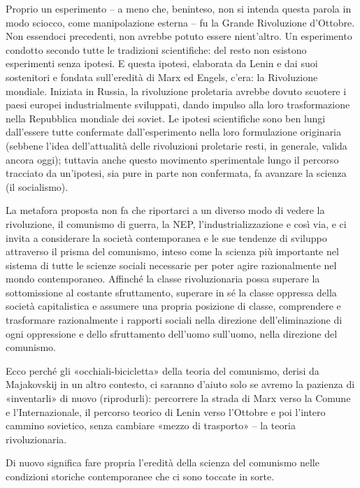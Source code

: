 \documentclass[../main]{subfiles}
\begin{document}
Proprio un esperimento – a meno che, beninteso, non si intenda questa parola in modo sciocco, come manipolazione esterna – fu la Grande Rivoluzione d'Ottobre. Non essendoci precedenti, non avrebbe potuto essere nient'altro. Un esperimento condotto secondo tutte le tradizioni scientifiche: del resto non esistono esperimenti senza ipotesi. E questa ipotesi, elaborata da Lenin e dai suoi sostenitori e fondata sull'eredità di Marx ed Engels, c'era: la Rivoluzione mondiale. Iniziata in Russia, la rivoluzione proletaria avrebbe dovuto scuotere i paesi europei industrialmente sviluppati, dando impulso alla loro trasformazione nella Repubblica mondiale dei soviet. Le ipotesi scientifiche sono ben lungi dall'essere tutte confermate dall'esperimento nella loro formulazione originaria (sebbene l'idea dell'attualità delle rivoluzioni proletarie resti, in generale, valida ancora oggi); tuttavia anche questo movimento sperimentale lungo il percorso tracciato da un'ipotesi, sia pure in parte non confermata, fa avanzare la scienza (il socialismo).

La metafora proposta non fa che riportarci a un diverso modo di vedere la rivoluzione, il comunismo di guerra, la NEP, l'industrializzazione e così via, e ci invita a considerare la società contemporanea e le sue tendenze di sviluppo attraverso il prisma del comunismo, inteso come la scienza più importante nel sistema di tutte le scienze sociali necessarie per poter agire razionalmente nel mondo contemporaneo. Affinché la classe rivoluzionaria possa superare la sottomissione al costante sfruttamento, superare in sé la classe oppressa della società capitalistica e assumere una propria posizione di classe, comprendere e trasformare razionalmente i rapporti sociali nella direzione dell'eliminazione di ogni oppressione e dello sfruttamento dell'uomo sull'uomo, nella direzione del comunismo.

Ecco perché gli «occhiali-bicicletta» della teoria del comunismo, derisi da Majakovskij in un altro contesto, ci saranno d'aiuto solo se avremo la pazienza di «inventarli» di nuovo (riprodurli): percorrere la strada di Marx verso la Comune e l'Internazionale, il percorso teorico di Lenin verso l'Ottobre e poi l'intero cammino sovietico, senza cambiare «mezzo di trasporto» – la teoria rivoluzionaria.

Di nuovo significa fare propria l'eredità della scienza del comunismo nelle condizioni storiche contemporanee che ci sono toccate in sorte.
\end{document}
